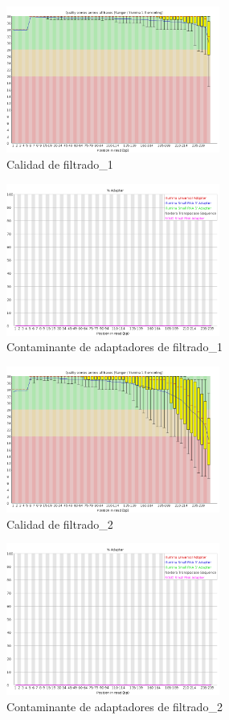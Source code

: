 \documentclass[journal, letterpaper, 11pt]{IEEEtran}
\begin{document}
\begin{figure}[H]
\centering
\includegraphics[width=7cm]{im_filtrado/2_2.png}
\caption{Calidad de filtrado\_1}
\end{figure}
\begin{figure}[H]
\centering
\includegraphics[width=7cm]{im_filtrado/1_1.png}
\caption{Contaminante de adaptadores de filtrado\_1}
\end{figure}
\begin{figure}[H]
\centering
\includegraphics[width=7cm]{im_filtrado/3_1.png}
\caption{Calidad de filtrado\_2}
\end{figure}
\begin{figure}[H]
\centering
\includegraphics[width=7cm]{im_filtrado/3_2.png}
\caption{Contaminante de adaptadores de filtrado\_2}
\end{figure}
\end{document}
